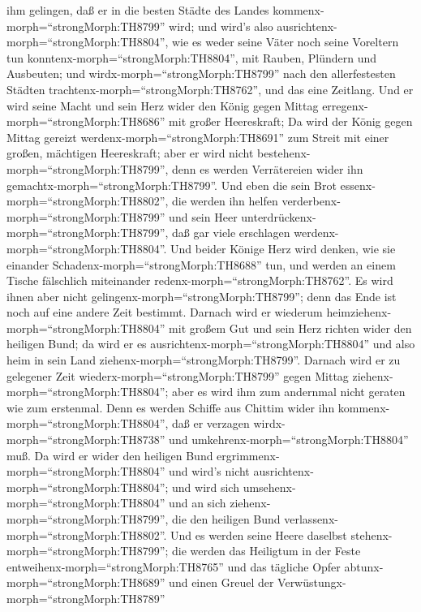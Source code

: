 ihm gelingen, daß er in die besten Städte des Landes
kommenx-morph=``strongMorph:TH8799'' wird; und wird's also
ausrichtenx-morph=``strongMorph:TH8804'', wie es weder seine Väter noch
seine Voreltern tun konntenx-morph=``strongMorph:TH8804'', mit Rauben,
Plündern und Ausbeuten; und wirdx-morph=``strongMorph:TH8799'' nach den
allerfestesten Städten trachtenx-morph=``strongMorph:TH8762'', und das
eine Zeitlang.  Und er wird seine Macht und sein Herz wider
den König gegen Mittag erregenx-morph=``strongMorph:TH8686'' mit großer
Heereskraft; Da wird der König gegen Mittag gereizt
werdenx-morph=``strongMorph:TH8691'' zum Streit mit einer großen,
mächtigen Heereskraft; aber er wird nicht
bestehenx-morph=``strongMorph:TH8799'', denn es werden Verrätereien
wider ihn gemachtx-morph=``strongMorph:TH8799''.  Und eben
die sein Brot essenx-morph=``strongMorph:TH8802'', die werden ihn helfen
verderbenx-morph=``strongMorph:TH8799'' und sein Heer
unterdrückenx-morph=``strongMorph:TH8799'', daß gar viele erschlagen
werdenx-morph=``strongMorph:TH8804''.  Und beider Könige
Herz wird denken, wie sie einander Schadenx-morph=``strongMorph:TH8688''
tun, und werden an einem Tische fälschlich miteinander
redenx-morph=``strongMorph:TH8762''. Es wird ihnen aber nicht
gelingenx-morph=``strongMorph:TH8799''; denn das Ende ist noch auf eine
andere Zeit bestimmt.  Darnach wird er wiederum
heimziehenx-morph=``strongMorph:TH8804'' mit großem Gut und sein Herz
richten wider den heiligen Bund; da wird er es
ausrichtenx-morph=``strongMorph:TH8804'' und also heim in sein Land
ziehenx-morph=``strongMorph:TH8799''.  Darnach wird er zu
gelegener Zeit wiederx-morph=``strongMorph:TH8799'' gegen Mittag
ziehenx-morph=``strongMorph:TH8804''; aber es wird ihm zum andernmal
nicht geraten wie zum erstenmal.  Denn es werden Schiffe
aus Chittim wider ihn kommenx-morph=``strongMorph:TH8804'', daß er
verzagen wirdx-morph=``strongMorph:TH8738'' und
umkehrenx-morph=``strongMorph:TH8804'' muß. Da wird er wider den
heiligen Bund ergrimmenx-morph=``strongMorph:TH8804'' und wird's nicht
ausrichtenx-morph=``strongMorph:TH8804''; und wird sich
umsehenx-morph=``strongMorph:TH8804'' und an sich
ziehenx-morph=``strongMorph:TH8799'', die den heiligen Bund
verlassenx-morph=``strongMorph:TH8802''.  Und es werden
seine Heere daselbst stehenx-morph=``strongMorph:TH8799''; die werden
das Heiligtum in der Feste entweihenx-morph=``strongMorph:TH8765'' und
das tägliche Opfer abtunx-morph=``strongMorph:TH8689'' und einen Greuel
der Verwüstungx-morph=``strongMorph:TH8789''
